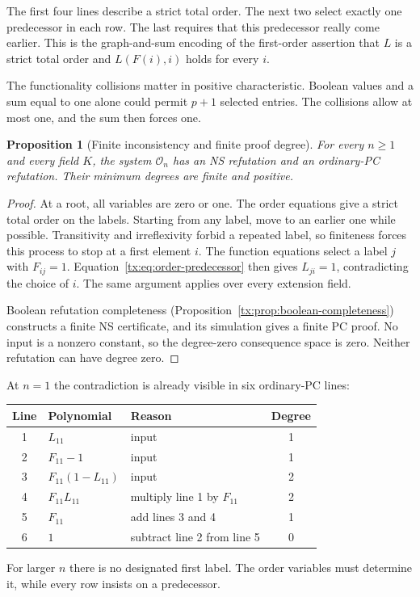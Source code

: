 \documentclass[11pt,a4paper,oneside,openany]{book}
\newtheorem{proposition}[theorem]{Proposition}
\theoremstyle{definition}\newtheorem{definition}[theorem]{Definition}
\theoremstyle{remark}\newtheorem{remark}[theorem]{Remark}
\numberwithin{equation}{chapter}
\begin{document}
The first four lines describe a strict total order. The next two select
exactly one predecessor in each row. The last requires that this
predecessor really come earlier. This is the graph-and-sum encoding of
the first-order assertion that $L$ is a strict total order and
$L(F(i),i)$ holds for every $i$.

The functionality collisions matter in positive characteristic.
Boolean values and a sum equal to one alone could permit $p+1$ selected
entries. The collisions allow at most one, and the sum then forces one.

\begin{proposition}[Finite inconsistency and finite proof degree]
\label{tx:prop:order-finite}
For every $n\ge1$ and every field $K$, the system $\mathcal O_n$ has
an NS refutation and an ordinary-PC refutation. Their minimum degrees
are finite and positive.
\end{proposition}
\begin{proof}
At a root, all variables are zero or one. The order equations give a
strict total order on the labels. Starting from any label, move to an
earlier one while possible. Transitivity and irreflexivity forbid a
repeated label, so finiteness forces this process to stop at a first
element $i$.
The function equations select a label $j$ with $F_{ij}=1$.
Equation~\eqref{tx:eq:order-predecessor} then gives $L_{ji}=1$,
contradicting the choice of $i$. The same argument applies over every
extension field.

Boolean refutation completeness
(Proposition~\ref{tx:prop:boolean-completeness}) constructs a finite
NS certificate, and its simulation gives a finite PC proof. No input
is a nonzero constant, so the degree-zero consequence space is zero.
Neither refutation can have degree zero.
\end{proof}

At $n=1$ the contradiction is already visible in six ordinary-PC lines:
\begin{center}
\begin{tabular}{@{}cllc@{}}
\toprule
Line & Polynomial & Reason & Degree\\
\midrule
1 & $L_{11}$ & input & 1\\
2 & $F_{11}-1$ & input & 1\\
3 & $F_{11}(1-L_{11})$ & input & 2\\
4 & $F_{11}L_{11}$ & multiply line 1 by $F_{11}$ & 2\\
5 & $F_{11}$ & add lines 3 and 4 & 1\\
6 & $1$ & subtract line 2 from line 5 & 0\\
\bottomrule
\end{tabular}
\end{center}
For larger $n$ there is no designated first label. The order variables
must determine it, while every row insists on a predecessor.
\end{document}
